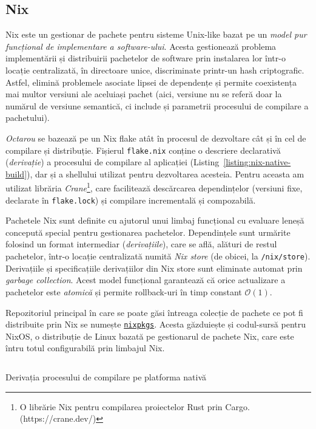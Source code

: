 \documentclass[a4paper]{article}
\begin{document}
\subsection{Nix}
Nix este un gestionar de pachete pentru sisteme Unix-like bazat pe un \textit{model pur funcțional de implementare a software-ului}\cite{edolstra}.
Acesta gestionează problema implementării și distribuirii pachetelor de software prin instalarea lor într-o locație centralizată, în directoare
unice, discriminate printr-un hash criptografic. Astfel, elimină problemele asociate lipsei de dependențe și permite coexistența mai multor
versiuni ale aceluiași pachet (aici, versiune nu se referă doar la numărul de versiune semantică, ci include și parametrii procesului de compilare
a pachetului).

\textit{Octarou} se bazează pe un Nix flake atât în procesul de dezvoltare cât și în cel de compilare și distribuție. Fișierul \texttt{flake.nix} conține
o descriere declarativă (\textit{derivație}) a procesului de compilare al aplicației (Listing~\ref{listing:nix-native-build}), dar și a shellului utilizat
pentru dezvoltarea acesteia. Pentru aceasta am
utilizat librăria \textit{Crane}\footnote{O librărie Nix pentru compilarea proiectelor Rust prin Cargo. (https://crane.dev/)}, care facilitează
descărcarea dependințelor (versiuni fixe, declarate în \texttt{flake.lock}) și compilare incrementală și compozabilă.

Pachetele Nix sunt definite cu ajutorul unui limbaj funcțional cu evaluare leneșă concepută special pentru gestionarea pachetelor. Dependințele
sunt urmărite folosind un format intermediar (\textit{derivațiile}), care se află, alături de restul pachetelor, într-o locație centralizată numită
\textit{Nix store} (de obicei, la \texttt{/nix/store}). Derivațiile și specificațiile derivațiilor din Nix store sunt eliminate automat prin
\textit{garbage collection}. Acest model funcțional garantează că orice actualizare a pachetelor este \textit{atomică} și permite rollback-uri
în timp constant\cite{edolstra} $\mathcal{O}(1)$.

Repozitoriul principal în care se poate găsi întreaga colecție de pachete ce pot fi distribuite prin Nix se numește \href{https://github.com/nixos/nixpkgs}{\texttt{nixpkgs}}.
Acesta găzduiește și codul-sursă pentru NixOS, o distribuție de Linux bazată pe gestionarul de pachete Nix, care este întru totul configurabilă prin
limbajul Nix.

\begin{listing}
	\inputminted{nix}{codeblocks/package.nix}
	\caption{Derivația procesului de compilare pe platforma nativă}
	\label{listing:nix-native-build}
\end{listing}
\end{document}
